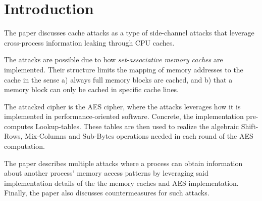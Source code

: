 \section{Introduction}
The paper discusses cache attacks as a type of side-channel attacks that leverage cross-process information leaking through CPU caches.

The attacks are possible due to how \textit{set-associative memory caches} are implemented.
Their structure limits the mapping of memory addresses to the cache in the sense a) always full memory blocks are cached, and b) that a memory block can only be cached in specific cache lines.

The attacked cipher is the AES cipher, where the attacks leverages how it is implemented in performance-oriented software.
Concrete, the implementation pre-computes Lookup-tables. These tables are then used to realize the algebraic Shift-Rows, Mix-Columns and Sub-Bytes operations needed in each round of the AES computation.

The paper describes multiple attacks where a process can obtain information about another process' memory access patterns by leveraging said implementation details of the the memory caches and AES implementation.
Finally, the paper also discusses countermeasures for such attacks.




